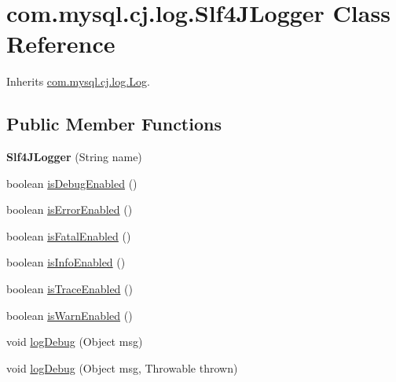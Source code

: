 \hypertarget{classcom_1_1mysql_1_1cj_1_1log_1_1_slf4_j_logger}{}\section{com.\+mysql.\+cj.\+log.\+Slf4\+J\+Logger Class Reference}
\label{classcom_1_1mysql_1_1cj_1_1log_1_1_slf4_j_logger}


Inherits \mbox{\hyperlink{interfacecom_1_1mysql_1_1cj_1_1log_1_1_log}{com.\+mysql.\+cj.\+log.\+Log}}.

\subsection*{Public Member Functions}
\begin{DoxyCompactItemize}
\item 
\mbox{\label{classcom_1_1mysql_1_1cj_1_1log_1_1_slf4_j_logger_af5581eba75f230b5acbb76789e679593}} 
{\bfseries Slf4\+J\+Logger} (String name)
\item 
boolean \mbox{\hyperlink{classcom_1_1mysql_1_1cj_1_1log_1_1_slf4_j_logger_a2063aafb5440a0a1a8b9038603916773}{is\+Debug\+Enabled}} ()
\item 
boolean \mbox{\hyperlink{classcom_1_1mysql_1_1cj_1_1log_1_1_slf4_j_logger_a3401a68eb92f0e0eec87e8140c36faa7}{is\+Error\+Enabled}} ()
\item 
boolean \mbox{\hyperlink{classcom_1_1mysql_1_1cj_1_1log_1_1_slf4_j_logger_ae5ee0af225f5bc993dc023b8b31de983}{is\+Fatal\+Enabled}} ()
\item 
boolean \mbox{\hyperlink{classcom_1_1mysql_1_1cj_1_1log_1_1_slf4_j_logger_ab21b243a10ab8a46a4706658298ecd5e}{is\+Info\+Enabled}} ()
\item 
boolean \mbox{\hyperlink{classcom_1_1mysql_1_1cj_1_1log_1_1_slf4_j_logger_afbf9106392050f7ca64b0ad7582b7517}{is\+Trace\+Enabled}} ()
\item 
boolean \mbox{\hyperlink{classcom_1_1mysql_1_1cj_1_1log_1_1_slf4_j_logger_aaf12f87af0d37c01118649ba65220a69}{is\+Warn\+Enabled}} ()
\item 
void \mbox{\hyperlink{classcom_1_1mysql_1_1cj_1_1log_1_1_slf4_j_logger_aef79b4ff2ba3058fe4f713db62707e6c}{log\+Debug}} (Object msg)
\item 
void \mbox{\hyperlink{classcom_1_1mysql_1_1cj_1_1log_1_1_slf4_j_logger_aeaf3ce8432b63f1b631e7ad698ea7aa6}{log\+Debug}} (Object msg, Throwable thrown)

\end{DoxyCompactItemize}
